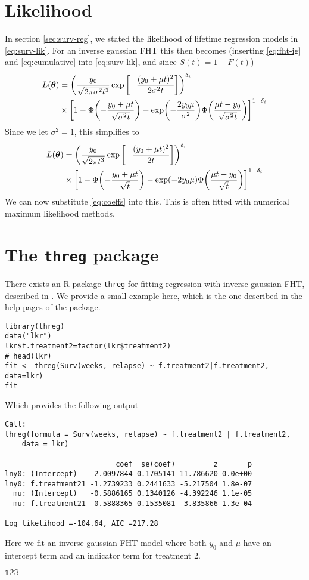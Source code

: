 \section{Likelihood}\label{sec:lik}
In section \ref{sec:surv-reg}, we stated the likelihood of lifetime regression models in \eqref{eq:surv-lik}. For an inverse gaussian FHT this then becomes (inserting \eqref{eq:fht-ig} and \eqref{eq:cumulative} into \eqref{eq:surv-lik}, and since $S(t)=1-F(t)$)
\begin{align}\label{eq:fht-lik}
\begin{split}
L(\btheta)&=\p*{\frac{y_0}{\sqrt{2\pi\sigma^2t^3}}\exp\left[-\frac{(y_0+\mu t)^2}{2\sigma^2t}\right]}^{\delta_i}\\
&\times\sqb*{1-\Phi\p*{-\frac{y_0+\mu t}{\sqrt{\sigma^2t}}}-\exp\p*{-\frac{2y_0\mu}{\sigma^2}}\Phi\p*{\frac{\mu t-y_0}{\sqrt{\sigma^2t}}}}^{1-\delta_i}
\end{split}
\end{align}
Since we let $\sigma^2=1$, this simplifies to
\begin{align}
\begin{split}
L(\btheta)&=\p*{\frac{y_0}{\sqrt{2\pi t^3}}\exp\left[-\frac{(y_0+\mu t)^2}{2t}\right]}^{\delta_i}\\
&\times\sqb*{1-\Phi\p*{-\frac{y_0+\mu t}{\sqrt{t}}}-\exp\p*{-2y_0\mu}\Phi\p*{\frac{\mu t-y_0}{\sqrt{t}}}}^{1-\delta_i}
\end{split}
\end{align}
We can now substitute \eqref{eq:coeffs} into this. This is often fitted with numerical maximum likelihood methods.

\section{The \texttt{threg} package}
There exists an R package \texttt{threg} for fitting regression with inverse gaussian FHT, described in \cite{threg}. We provide a small example here, which is the one described in the help pages of the package.
\begin{verbatim}
library(threg)
data("lkr")
lkr$f.treatment2=factor(lkr$treatment2)
# head(lkr)
fit <- threg(Surv(weeks, relapse) ~ f.treatment2|f.treatment2, data=lkr)
fit
\end{verbatim}
Which provides the following output
\begin{verbatim}
Call:
threg(formula = Surv(weeks, relapse) ~ f.treatment2 | f.treatment2, 
    data = lkr)

                          coef  se(coef)         z       p
lny0: (Intercept)    2.0097844 0.1705141 11.786620 0.0e+00
lny0: f.treatment21 -1.2739233 0.2441633 -5.217504 1.8e-07
  mu: (Intercept)   -0.5886165 0.1340126 -4.392246 1.1e-05
  mu: f.treatment21  0.5888365 0.1535081  3.835866 1.3e-04

Log likelihood =-104.64, AIC =217.28
\end{verbatim}
Here we fit an inverse gaussian FHT model where both $y_0$ and $\mu$ have an intercept term and an indicator term for treatment 2.

$\mathds{123}$
